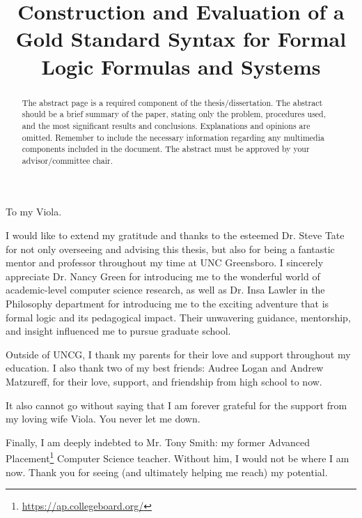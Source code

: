 \documentclass[ms]{uncgdissertationexp2}
\title{Construction and Evaluation of a Gold Standard Syntax for Formal Logic Formulas and Systems}
\theoremstyle{plain}
\theoremstyle{definition}
\theoremstyle{remark}
\begin{document}
\frontmatter      %

\begin{abstract}
	The abstract page is a required component of the thesis/dissertation.
	The abstract should be a brief summary of the paper, stating only the
	problem, procedures used, and the most significant results and
	conclusions. Explanations and opinions are omitted. Remember to
	include the necessary information regarding any multimedia components
	included in the document. The abstract must be approved by your
	advisor/committee chair. 
\end{abstract}

\maketitlepage

\makecopyrightpage

\begin{dedication}
	To my Viola.
\end{dedication}

\makeapprovalpage

\begin{acknowledgments}
	I would like to extend my gratitude and thanks to the esteemed Dr. Steve Tate for not only overseeing and advising this thesis, but also for being a fantastic mentor and professor throughout my time at UNC Greensboro. I sincerely appreciate Dr. Nancy Green for introducing me to the wonderful world of academic-level computer science research, as well as Dr. Insa Lawler in the Philosophy department for introducing me to the exciting adventure that is formal logic and its pedagogical impact. Their unwavering guidance, mentorship, and insight influenced me to pursue graduate school.
	
	Outside of UNCG, I thank my parents for their love and support throughout my education. I also thank two of my best friends: Audree Logan and Andrew Matzureff, for their love, support, and friendship from high school to now.
	
	It also cannot go without saying that I am forever grateful for the support from my loving wife Viola. You never let me down.
	
	Finally, I am deeply indebted to Mr. Tony Smith: my former Advanced Placement\footnote{\url{https://ap.collegeboard.org/}} Computer Science teacher. Without him, I would not be where I am now. Thank you for seeing (and ultimately helping me reach) my potential.
\end{acknowledgments}
\end{document}
